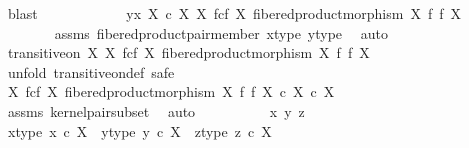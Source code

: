 \begin{isabellebody}
\ blast\isanewline
\ \ \ \ \isanewline
\ \ \ \ \isamarkupfalse%
\ \isamarkupfalse%
\ {\isachardoublequoteopen}{\isasymlangle}y{\isacharcomma}{\kern0pt}x{\isasymrangle}\ {\isasymin}\isactrlbsub X\ {\isasymtimes}\isactrlsub c\ X\isactrlesub \ {\isacharparenleft}{\kern0pt}X\ \isactrlbsub f\isactrlesub {\isasymtimes}\isactrlsub c\isactrlbsub f\isactrlesub \ X{\isacharcomma}{\kern0pt}\ fibered{\isacharunderscore}{\kern0pt}product{\isacharunderscore}{\kern0pt}morphism\ X\ f\ f\ X{\isacharparenright}{\kern0pt}{\isachardoublequoteclose}\isanewline
\ \ \ \ \ \ \isamarkupfalse%
\ assms\ fibered{\isacharunderscore}{\kern0pt}product{\isacharunderscore}{\kern0pt}pair{\isacharunderscore}{\kern0pt}member\ x{\isacharunderscore}{\kern0pt}type\ y{\isacharunderscore}{\kern0pt}type\ \isamarkupfalse%
\ auto\isanewline
\ \ \isamarkupfalse%
\isanewline
\isanewline
\ \ \isamarkupfalse%
\ {\isachardoublequoteopen}transitive{\isacharunderscore}{\kern0pt}on\ X\ {\isacharparenleft}{\kern0pt}X\ \isactrlbsub f\isactrlesub {\isasymtimes}\isactrlsub c\isactrlbsub f\isactrlesub \ X{\isacharcomma}{\kern0pt}\ fibered{\isacharunderscore}{\kern0pt}product{\isacharunderscore}{\kern0pt}morphism\ X\ f\ f\ X{\isacharparenright}{\kern0pt}{\isachardoublequoteclose}\isanewline
\ \ \isamarkupfalse%
\ {\isacharparenleft}{\kern0pt}unfold\ transitive{\isacharunderscore}{\kern0pt}on{\isacharunderscore}{\kern0pt}def{\isacharcomma}{\kern0pt}\ safe{\isacharparenright}{\kern0pt}\isanewline
\ \ \ \ \isamarkupfalse%
\ {\isachardoublequoteopen}{\isacharparenleft}{\kern0pt}X\ \isactrlbsub f\isactrlesub {\isasymtimes}\isactrlsub c\isactrlbsub f\isactrlesub \ X{\isacharcomma}{\kern0pt}\ fibered{\isacharunderscore}{\kern0pt}product{\isacharunderscore}{\kern0pt}morphism\ X\ f\ f\ X{\isacharparenright}{\kern0pt}\ {\isasymsubseteq}\isactrlsub c\ X\ {\isasymtimes}\isactrlsub c\ X{\isachardoublequoteclose}\isanewline
\ \ \ \ \ \ \isamarkupfalse%
\ assms\ kernel{\isacharunderscore}{\kern0pt}pair{\isacharunderscore}{\kern0pt}subset\ \isamarkupfalse%
\ auto\isanewline
\ \ \isamarkupfalse%
\ \isanewline
\ \ \ \ \isamarkupfalse%
\ x\ y\ z\ \isanewline
\ \ \ \ \isamarkupfalse%
\ x{\isacharunderscore}{\kern0pt}type{\isacharcolon}{\kern0pt}\ {\isachardoublequoteopen}x\ {\isasymin}\isactrlsub c\ X{\isachardoublequoteclose}\ \ y{\isacharunderscore}{\kern0pt}type{\isacharcolon}{\kern0pt}\ {\isachardoublequoteopen}y\ {\isasymin}\isactrlsub c\ X{\isachardoublequoteclose}\ \ z{\isacharunderscore}{\kern0pt}type{\isacharcolon}{\kern0pt}\ {\isachardoublequoteopen}z\ {\isasymin}\isactrlsub c\ X{\isachardoublequoteclose}\isanewline

\end{isabellebody}
